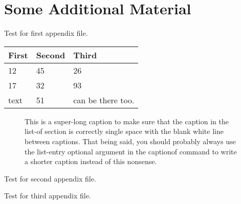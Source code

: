 \chapter{Some Additional Material}

Test for first appendix file.


\begin{table}[htbp]%
    \label{first}
    \begin{tabularx}{6.5in}{XXX}
      \hline
      First & Second & Third \\
      \hline
      12 & 45 & 26 \\
      17 & 32 & 93 \\
      text & 51 & can be there too. \\	
      \hline
    \end{tabularx}
\end{table}


\begin{figure}[h]
    \centering
    \caption[Figure Caption]{This is a super-long caption to make sure that the caption in the list-of section is correctly single space with the blank white line between captions. That being said, you should probably always use the list-entry optional argument in the captionof command to write a shorter caption instead of this nonsense.}
    \label{fig:my_label}
\end{figure}

Test for second appendix file.



Test for third appendix file.


